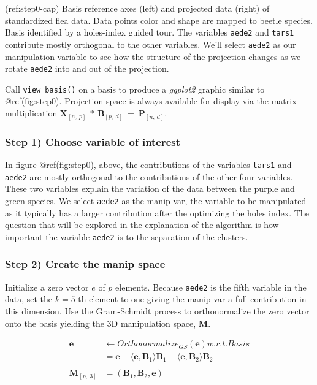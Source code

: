 (ref:step0-cap) Basis reference axes (left) and projected data (right) of standardized flea data. Data points color and shape are mapped to beetle species. Basis identified by a holes-index guided tour. The variables \texttt{aede2} and \texttt{tars1} contribute mostly orthogonal to the other variables. We'll select \texttt{aede2} as our manipulation variable to see how the structure of the projection changes as we rotate \texttt{aede2} into and out of the projection.

Call \texttt{view\_basis()} on a basis to produce a \emph{ggplot2} graphic similar to @ref(fig:step0). Projection space is always available for display via the matrix multiplication \(\textbf{X}_{[n,~p]} ~*~ \textbf{B}_{[p,~d]} ~=~ \textbf{P}_{[n,~d]}\).

\hypertarget{step-1-choose-variable-of-interest}{%
\subsubsection{Step 1) Choose variable of interest}\label{step-1-choose-variable-of-interest}}

In figure @ref(fig:step0), above, the contributions of the variables \texttt{tars1} and \texttt{aede2} are mostly orthogonal to the contributions of the other four variables. These two variables explain the variation of the data between the purple and green species. We select \texttt{aede2} as the manip var, the variable to be manipulated as it typically has a larger contribution after the optimizing the holes index. The question that will be explored in the explanation of the algorithm is how important the variable \texttt{aede2} is to the separation of the clusters.

\hypertarget{step-2-create-the-manip-space}{%
\subsubsection{Step 2) Create the manip space}\label{step-2-create-the-manip-space}}

Initialize a zero vector \(e\) of \(p\) elements. Because \texttt{aede2} is the fifth variable in the data, set the \(k=5\)-th element to one giving the manip var a full contribution in this dimension. Use the Gram-Schmidt process to orthonormalize the zero vector onto the basis yielding the 3D manipulation space, \textbf{M}.

\begin{align*}
  \textbf{e} &\leftarrow Orthonormalize_{GS}(\textbf{e}) w.r.t. Basis \\
  &= \textbf{e} - \langle \textbf{e},\textbf{B}_1 \rangle \textbf{B}_1 - \langle \textbf{e}, \textbf{B}_2 \rangle \textbf{B}_2 \\
  \\
  \textbf{M}_{[p,~3]} &= (\textbf{B}_1,\textbf{B}_2,\textbf{e})
\end{align*}


